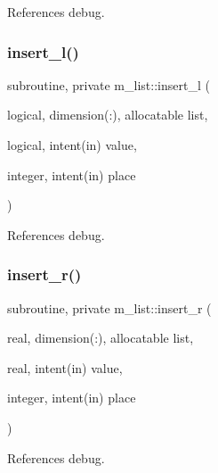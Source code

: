 References debug.

\mbox{\label{namespacem__list_a6108584670ced9dc4469e76ceb808730}} 
\subsubsection{\texorpdfstring{insert\+\_\+l()}{insert\_l()}}
{\footnotesize\ttfamily subroutine, private m\+\_\+list\+::insert\+\_\+l (\begin{DoxyParamCaption}\item[{logical, dimension(\+:), allocatable}]{list,  }\item[{logical, intent(in)}]{value,  }\item[{integer, intent(in)}]{place }\end{DoxyParamCaption})\hspace{0.3cm}{\ttfamily [private]}}



References debug.

\mbox{\label{namespacem__list_affd8a9996750ccf655cf677136d9fc4e}} 
\subsubsection{\texorpdfstring{insert\+\_\+r()}{insert\_r()}}
{\footnotesize\ttfamily subroutine, private m\+\_\+list\+::insert\+\_\+r (\begin{DoxyParamCaption}\item[{real, dimension(\+:), allocatable}]{list,  }\item[{real, intent(in)}]{value,  }\item[{integer, intent(in)}]{place }\end{DoxyParamCaption})\hspace{0.3cm}{\ttfamily [private]}}



References debug.

\mbox{\label{namespacem__list_aeb2a9d8e479c44cca127db7c65abb1f3}} 

